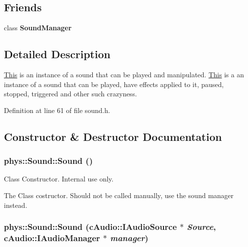 \subsection*{Friends}
\begin{DoxyCompactItemize}
\item 
\hypertarget{classphys_1_1Sound_aee940642f2974e262db9284c0b1d9766}{
class {\bfseries SoundManager}}
\label{dc/d2f/classphys_1_1Sound_aee940642f2974e262db9284c0b1d9766}

\end{DoxyCompactItemize}


\subsection{Detailed Description}
\hyperlink{structThis}{This} is an instance of a sound that can be played and manipulated. \hyperlink{structThis}{This} is a an instance of a sound that can be played, have effects applied to it, paused, stopped, triggered and other such crazyness. 

Definition at line 61 of file sound.h.



\subsection{Constructor \& Destructor Documentation}
\hypertarget{classphys_1_1Sound_a6a9d4b475da9453c9b02ca2c49a6fa76}{
\subsubsection[{Sound}]{\setlength{\rightskip}{0pt plus 5cm}phys::Sound::Sound ()}}
\label{dc/d2f/classphys_1_1Sound_a6a9d4b475da9453c9b02ca2c49a6fa76}


Class Constructor. Internal use only. 

The Class costructor. Should not be called manually, use the sound manager instead. \hypertarget{classphys_1_1Sound_a0452d6079bcb201f9d2f3b2742eb21b6}{
\subsubsection[{Sound}]{\setlength{\rightskip}{0pt plus 5cm}phys::Sound::Sound (cAudio::IAudioSource $\ast$ {\em Source}, \/  cAudio::IAudioManager $\ast$ {\em manager})}}
\label{dc/d2f/classphys_1_1Sound_a0452d6079bcb201f9d2f3b2742eb21b6}


